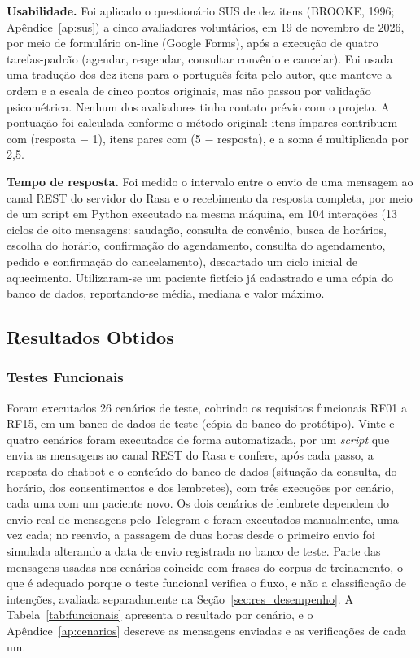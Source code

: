 \documentclass[12pt,a4paper]{extarticle}
\begin{document}
\textbf{Usabilidade.} Foi aplicado o questionário SUS de dez itens (BROOKE, 1996; Apêndice~\ref{ap:sus}) a cinco avaliadores voluntários, em 19 de novembro de 2026, por meio de formulário on-line (Google Forms), após a execução de quatro tarefas-padrão (agendar, reagendar, consultar convênio e cancelar). Foi usada uma tradução dos dez itens para o português feita pelo autor, que manteve a ordem e a escala de cinco pontos originais, mas não passou por validação psicométrica. Nenhum dos avaliadores tinha contato prévio com o projeto. A pontuação foi calculada conforme o método original: itens ímpares contribuem com (resposta $-$ 1), itens pares com (5 $-$ resposta), e a soma é multiplicada por 2,5.

\textbf{Tempo de resposta.} Foi medido o intervalo entre o envio de uma mensagem ao canal REST do servidor do Rasa e o recebimento da resposta completa, por meio de um script em Python executado na mesma máquina, em 104 interações (13 ciclos de oito mensagens: saudação, consulta de convênio, busca de horários, escolha do horário, confirmação do agendamento, consulta do agendamento, pedido e confirmação do cancelamento), descartado um ciclo inicial de aquecimento. Utilizaram-se um paciente fictício já cadastrado e uma cópia do banco de dados, reportando-se média, mediana e valor máximo.

\subsection{Resultados Obtidos}
\label{sec:resultados_obtidos}

\subsubsection{Testes Funcionais}
\label{sec:res_funcionais}

Foram executados 26 cenários de teste, cobrindo os requisitos funcionais RF01 a RF15, em um banco de dados de teste (cópia do banco do protótipo). Vinte e quatro cenários foram executados de forma automatizada, por um \textit{script} que envia as mensagens ao canal REST do Rasa e confere, após cada passo, a resposta do chatbot e o conteúdo do banco de dados (situação da consulta, do horário, dos consentimentos e dos lembretes), com três execuções por cenário, cada uma com um paciente novo. Os dois cenários de lembrete dependem do envio real de mensagens pelo Telegram e foram executados manualmente, uma vez cada; no reenvio, a passagem de duas horas desde o primeiro envio foi simulada alterando a data de envio registrada no banco de teste. Parte das mensagens usadas nos cenários coincide com frases do corpus de treinamento, o que é adequado porque o teste funcional verifica o fluxo, e não a classificação de intenções, avaliada separadamente na Seção~\ref{sec:res_desempenho}. A Tabela~\ref{tab:funcionais} apresenta o resultado por cenário, e o Apêndice~\ref{ap:cenarios} descreve as mensagens enviadas e as verificações de cada um.
\end{document}
